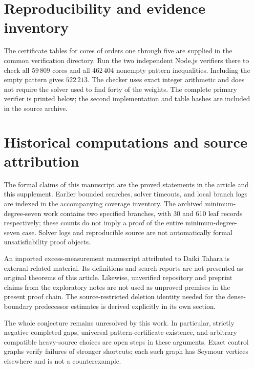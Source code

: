 \section{Reproducibility and evidence inventory}
The certificate tables for cores of orders one through five are supplied
in the common verification directory. Run the two independent Node.js
verifiers there to check all $59\,809$ cores and all $462\,404$ nonempty
pattern inequalities. Including the empty pattern gives $522\,213$.
The checker uses exact integer arithmetic and does not require the solver
used to find forty of the weights. The complete primary verifier is printed
below; the second implementation and table hashes are included in the
source archive.


\section{Historical computations and source attribution}
The formal claims of this manuscript are the proved statements in the
article and this supplement. Earlier bounded searches, solver timeouts,
and local branch logs are indexed in the accompanying coverage inventory.
The archived minimum-degree-seven work contains two specified branches,
with 30 and 610 leaf records respectively; these counts do not imply a
proof of the entire minimum-degree-seven case. Solver logs and reproducible
source are not automatically formal unsatisfiability proof objects.

An imported excess-measurement manuscript attributed to Daiki Tahara is
external related material. Its definitions and search reports are not
presented as original theorems of this article. Likewise, unverified
repository and preprint claims from the exploratory notes are not used as
unproved premises in the present proof chain. The source-restricted
deletion identity needed for the dense-boundary predecessor estimates is
derived explicitly in its own section.

The whole conjecture remains unresolved by this work. In particular,
strictly negative completed gaps, universal pattern-certificate existence,
and arbitrary compatible heavy-source choices are open steps in these
arguments. Exact control graphs verify failures of stronger shortcuts;
each such graph has Seymour vertices elsewhere and is not a counterexample.
